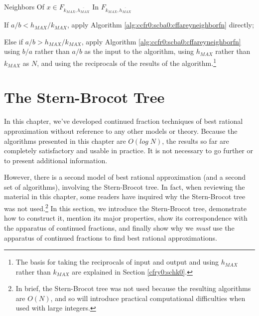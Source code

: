 \begin{vworkalgorithmstatementpar}{Neighbors Of 
                                   \mbox{\boldmath $x \in F_{k_{MAX},\overline{h_{MAX}}}$} 
                                   In \mbox{\boldmath $F_{k_{MAX},\overline{h_{MAX}}}$}}
\label{alg:ccfr0:scba0:cffareyneighborfab}
\begin{alglvl0}
\item If $a/b < h_{MAX}/k_{MAX}$, apply Algorithm 
      \ref{alg:ccfr0:scba0:cffareyneighborfn} directly;

\item Else if $a/b > h_{MAX}/k_{MAX}$, apply Algorithm
      \ref{alg:ccfr0:scba0:cffareyneighborfn} using $b/a$ rather
	  than $a/b$ as the input to the algorithm, using $h_{MAX}$ 
	  rather than $k_{MAX}$ as $N$, and
	  using the reciprocals of the results of the algorithm.\footnote{The
	  basis for taking the reciprocals of input and output and
	  using $h_{MAX}$ rather than $k_{MAX}$ are explained
	  in Section \ref{cfry0:schk0}.}
\end{alglvl0}
\end{vworkalgorithmstatementpar}
\vworkalgorithmfooter{}


\section{The Stern-Brocot Tree}
\label{ccfr0:ssbt0}

In this chapter, we've developed continued fraction techniques of best
rational approximation without reference to any other models or theory.
Because the algorithms presented in this chapter are $O(log \; N)$,
the results so far are completely satisfactory and usable in practice.
It is not necessary to go further or to present additional information.

However, there is a second model of best rational approximation (and a second
set of algorithms), involving
the Stern-Brocot tree.  In fact, when reviewing the material in this
chapter, some readers have inquired why the Stern-Brocot tree was not
used.\footnote{In brief, the Stern-Brocot tree was not used because
the resulting algorithms are $O(N)$, and so will introduce practical
computational difficulties when used with large integers.}  In this
section, we introduce the Stern-Brocot tree, demonstrate how to construct it,
mention its major properties, show its correspondence with the apparatus of
continued fractions, and finally show why we \emph{must} use the apparatus
of continued fractions to find best rational approximations.


